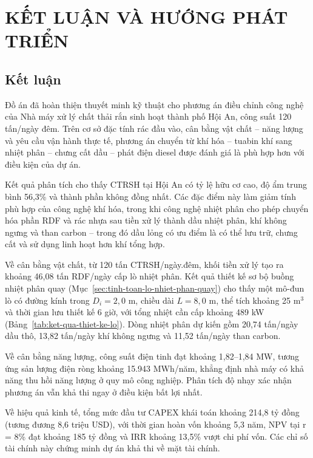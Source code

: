 \documentclass[../main.tex]{subfiles}
\begin{document}
\chapter*{KẾT LUẬN VÀ HƯỚNG PHÁT TRIỂN}
{}
\label{chuong7}

\section*{Kết luận}

Đồ án đã hoàn thiện thuyết minh kỹ thuật cho phương án điều chỉnh công nghệ của Nhà máy xử lý chất thải rắn sinh hoạt thành phố Hội An, công suất 120 tấn/ngày đêm. Trên cơ sở đặc tính rác đầu vào, cân bằng vật chất -- năng lượng và yêu cầu vận hành thực tế, phương án chuyển từ khí hóa -- tuabin khí sang nhiệt phân -- chưng cất dầu -- phát điện diesel được đánh giá là phù hợp hơn với điều kiện của dự án.

Kết quả phân tích cho thấy CTRSH tại Hội An có tỷ lệ hữu cơ cao, độ ẩm trung bình 56,3\% và thành phần không đồng nhất. Các đặc điểm này làm giảm tính phù hợp của công nghệ khí hóa, trong khi công nghệ nhiệt phân cho phép chuyển hóa phần RDF và rác nhựa sau tiền xử lý thành dầu nhiệt phân, khí không ngưng và than carbon -- trong đó dầu lỏng có ưu điểm là có thể lưu trữ, chưng cất và sử dụng linh hoạt hơn khí tổng hợp.

Về cân bằng vật chất, từ 120 tấn CTRSH/ngày.đêm, khối tiền xử lý tạo ra khoảng 46,08 tấn RDF/ngày cấp lò nhiệt phân. Kết quả thiết kế sơ bộ buồng nhiệt phân quay (Mục~\ref{sec:tinh-toan-lo-nhiet-phan-quay}) cho thấy một mô-đun lò có đường kính trong $D_i = 2{,}0$ m, chiều dài $L = 8{,}0$ m, thể tích khoảng 25 m$^3$ và thời gian lưu thiết kế 6 giờ, với tổng nhiệt cần cấp khoảng 489 kW (Bảng~\ref{tab:ket-qua-thiet-ke-lo}). Dòng nhiệt phân dự kiến gồm 20,74 tấn/ngày dầu thô, 13,82 tấn/ngày khí không ngưng và 11,52 tấn/ngày than carbon.

Về cân bằng năng lượng, công suất điện tinh đạt khoảng 1,82--1,84 MW, tương ứng sản lượng điện ròng khoảng 15.943 MWh/năm, khẳng định nhà máy có khả năng thu hồi năng lượng ở quy mô công nghiệp. Phân tích độ nhạy xác nhận phương án vẫn khả thi ngay ở điều kiện bất lợi nhất.

Về hiệu quả kinh tế, tổng mức đầu tư CAPEX khái toán khoảng 214,8 tỷ đồng (tương đương 8,6 triệu USD), với thời gian hoàn vốn khoảng 5,3 năm, NPV tại r = 8\% đạt khoảng 185 tỷ đồng và IRR khoảng 13,5\% vượt chi phí vốn. Các chỉ số tài chính này chứng minh dự án khả thi về mặt tài chính.
\end{document}
